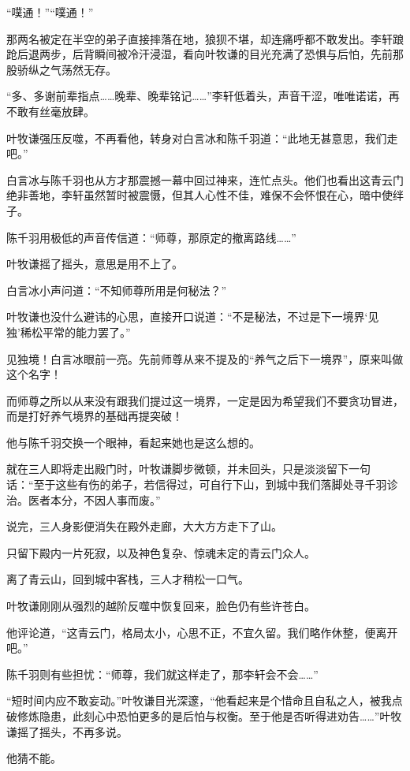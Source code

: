 “噗通！”“噗通！”

那两名被定在半空的弟子直接摔落在地，狼狈不堪，却连痛呼都不敢发出。李轩踉跄后退两步，后背瞬间被冷汗浸湿，看向叶牧谦的目光充满了恐惧与后怕，先前那股骄纵之气荡然无存。

“多、多谢前辈指点……晚辈、晚辈铭记……”李轩低着头，声音干涩，唯唯诺诺，再不敢有丝毫放肆。

叶牧谦强压反噬，不再看他，转身对白言冰和陈千羽道：“此地无甚意思，我们走吧。”

白言冰与陈千羽也从方才那震撼一幕中回过神来，连忙点头。他们也看出这青云门绝非善地，李轩虽然暂时被震慑，但其人心性不佳，难保不会怀恨在心，暗中使绊子。

陈千羽用极低的声音传信道：“师尊，那原定的撤离路线……”

叶牧谦摇了摇头，意思是用不上了。

白言冰小声问道：“不知师尊所用是何秘法？”

叶牧谦也没什么避讳的心思，直接开口说道：“不是秘法，不过是下一境界‘见独’稀松平常的能力罢了。”

见独境！白言冰眼前一亮。先前师尊从来不提及的“养气之后下一境界”，原来叫做这个名字！

而师尊之所以从来没有跟我们提过这一境界，一定是因为希望我们不要贪功冒进，而是打好养气境界的基础再提突破！

他与陈千羽交换一个眼神，看起来她也是这么想的。

就在三人即将走出殿门时，叶牧谦脚步微顿，并未回头，只是淡淡留下一句话：“至于这些有伤的弟子，若信得过，可自行下山，到城中我们落脚处寻千羽诊治。医者本分，不因人事而废。”

说完，三人身影便消失在殿外走廊，大大方方走下了山。

只留下殿内一片死寂，以及神色复杂、惊魂未定的青云门众人。

\vspace{2em}

离了青云山，回到城中客栈，三人才稍松一口气。

叶牧谦刚刚从强烈的越阶反噬中恢复回来，脸色仍有些许苍白。

他评论道，“这青云门，格局太小，心思不正，不宜久留。我们略作休整，便离开吧。”

陈千羽则有些担忧：“师尊，我们就这样走了，那李轩会不会……”

“短时间内应不敢妄动。”叶牧谦目光深邃，“他看起来是个惜命且自私之人，被我点破修炼隐患，此刻心中恐怕更多的是后怕与权衡。至于他是否听得进劝告……”叶牧谦摇了摇头，不再多说。

他猜不能。

\vspace{2em}

